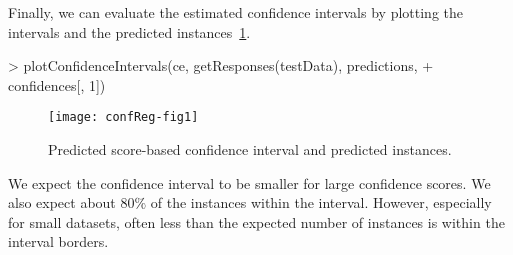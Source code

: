 \documentclass{article}
\begin{document}
Finally, we can evaluate the estimated confidence intervals 
by plotting the intervals and the predicted instances~\ref{fig:fig1}.


\begin{Schunk}
\begin{Sinput}
> plotConfidenceIntervals(ce, getResponses(testData), predictions, 
+     confidences[, 1])
\end{Sinput}
\end{Schunk}
\begin{figure}
\begin{center}
\texttt{[image: confReg-fig1]}
\end{center}
\caption{Predicted score-based confidence interval and predicted instances.}
\label{fig:fig1}
\end{figure}

We expect the confidence interval to be smaller for large
confidence scores. We also expect about $80\%$ of the
instances within the interval. However, especially for
small datasets, often less than the expected number of
instances is within the interval borders.
\end{document}
